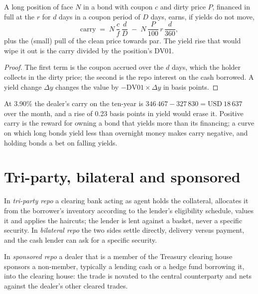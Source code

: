 \begin{proposition}\label{prop:m2:repo-and-specials:carry}
A long position of face $N$ in a bond with coupon $c$ and dirty price $P$,
financed in full at the  $r$ for $d$ days in a coupon period of $D$
days, earns, if yields do not move,
\[
\text{carry} \;=\; N\,\frac{c}{f}\,\frac{d}{D} \;-\; N\,\frac{P}{100}\,r\,\frac{d}{360},
\]
plus the (small) pull of the clean price towards par. The yield rise that
would wipe it out is the carry divided by the position's DV01.
\end{proposition}
\begin{proof}
The first term is the coupon accrued over the $d$ days, which the holder
collects in the dirty price; the second is the repo interest on the cash
borrowed. A yield change $\Delta y$ changes the value by $-\mathrm{DV01}\times
\Delta y$ in basis points.
\end{proof}

At 3.90\% the dealer's carry on the ten-year is $346\,467 - 327\,830 =
\text{USD}~18\,637$ over the month, and a rise of 0.23 basis points in yield would
erase it. Positive carry is the reward for owning a bond that yields more
than its financing; a curve on which long bonds yield less than overnight
money makes carry negative, and holding bonds a bet on falling yields.

\section{Tri-party, bilateral and sponsored}

\begin{definition}\label{def:m2:repo-and-specials:triparty}
In \emph{tri-party repo} a clearing bank acting as
agent holds the collateral, allocates it from the borrower's inventory
according to the lender's eligibility schedule, values it and applies the
haircuts; the lender is lent against a basket, never a specific security.
In \emph{bilateral repo} the two sides settle directly,
delivery versus payment, and the cash lender can ask for a specific security.
\end{definition}

\begin{definition}\label{def:m2:repo-and-specials:sponsored}
In \emph{sponsored repo} a dealer that is a member of
the Treasury clearing house sponsors a non-member, typically a  lending cash or a hedge fund borrowing it, into the clearing house: the
trade is novated to the central counterparty and nets against the dealer's
other cleared trades.
\end{definition}

